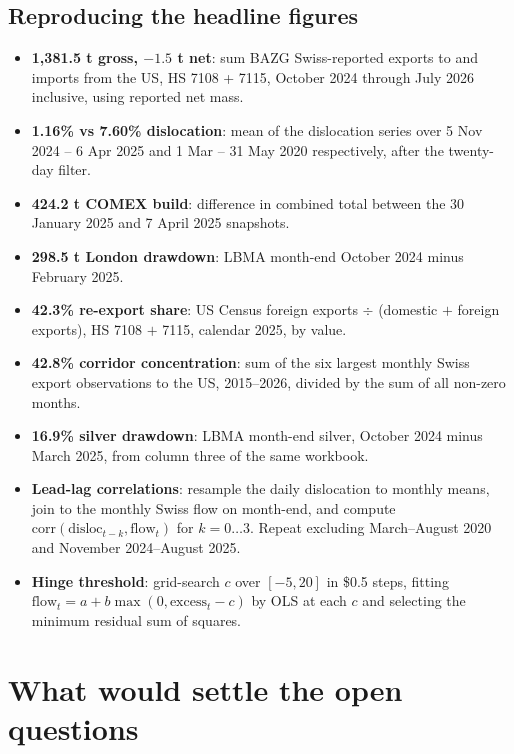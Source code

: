 \documentclass[11pt,a4paper]{article}
\begin{document}
\subsection{Reproducing the headline figures}

\begin{itemize}[leftmargin=*]
\item \textbf{1{,}381.5 t gross, $-1.5$ t net}: sum BAZG Swiss-reported exports to and imports
from the US, HS 7108 + 7115, October 2024 through July 2026 inclusive, using reported net mass.
\item \textbf{1.16\% vs 7.60\% dislocation}: mean of the dislocation series over
5 Nov 2024 -- 6 Apr 2025 and 1 Mar -- 31 May 2020 respectively, after the twenty-day filter.
\item \textbf{424.2 t COMEX build}: difference in combined total between the 30 January 2025 and
7 April 2025 snapshots.
\item \textbf{298.5 t London drawdown}: LBMA month-end October 2024 minus February 2025.
\item \textbf{42.3\% re-export share}: US Census foreign exports $\div$ (domestic $+$ foreign
exports), HS 7108 $+$ 7115, calendar 2025, by value.
\item \textbf{42.8\% corridor concentration}: sum of the six largest monthly Swiss export
observations to the US, 2015--2026, divided by the sum of all non-zero months.
\item \textbf{16.9\% silver drawdown}: LBMA month-end silver, October 2024 minus March 2025,
from column three of the same workbook.
\item \textbf{Lead-lag correlations}: resample the daily dislocation to monthly means, join to
the monthly Swiss flow on month-end, and compute $\mathrm{corr}(\text{disloc}_{t-k},
\text{flow}_t)$ for $k=0\ldots3$. Repeat excluding March--August 2020 and November
2024--August 2025.
\item \textbf{Hinge threshold}: grid-search $c$ over $[-5, 20]$ in \$0.5 steps, fitting
$\text{flow}_t = a + b\max(0, \text{excess}_t - c)$ by OLS at each $c$ and selecting the
minimum residual sum of squares.
\end{itemize}

\section{What would settle the open questions}
\end{document}
